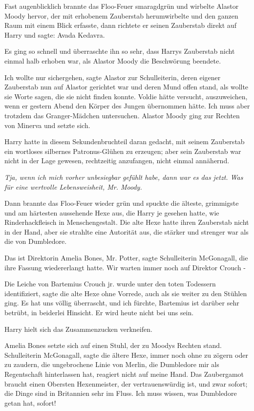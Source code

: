 Fast augenblicklich brannte das Floo-Feuer smaragdgrün und wirbelte Alastor
Moody hervor, der mit erhobenem Zauberstab herumwirbelte und den ganzen Raum mit
einem Blick erfasste, dann richtete er seinen Zauberstab direkt auf Harry und
sagte: \glqq{}Avada Kedavra.\grqq{}

Es ging so schnell und überraschte ihn so sehr, dass Harrys Zauberstab nicht
einmal halb erhoben war, als Alastor Moody die Beschwörung beendete.

\glqq{}Ich wollte nur sichergehen\grqq{}, sagte Alastor zur Schulleiterin, deren
eigener Zauberstab nun auf Alastor gerichtet war und deren Mund offen stand, als
wollte sie Worte sagen, die sie nicht finden konnte. \glqq{}Voldie hätte
versucht, auszuweichen, wenn er gestern Abend den Körper des Jungen übernommen
hätte. Ich muss aber trotzdem das Granger-Mädchen untersuchen.\grqq{} Alastor Moody
ging zur Rechten von Minerva und setzte sich.

Harry hatte in diesem Sekundenbruchteil daran gedacht, mit seinem Zauberstab ein
wortloses silbernes Patronus-Glühen zu erzeugen; aber sein Zauberstab war nicht
in der Lage gewesen, rechtzeitig anzufangen, nicht einmal annähernd.

\emph{Tja, wenn ich mich vorher unbesiegbar gefühlt habe, dann war es das jetzt.
Was für eine wertvolle Lebensweisheit, Mr. Moody.}

Dann brannte das Floo-Feuer wieder grün und spuckte die älteste, grimmigste und
am härtesten aussehende Hexe aus, die Harry je gesehen hatte, wie
Rinderhackfleisch in Menschengestalt. Die alte Hexe hatte ihren Zauberstab nicht
in der Hand, aber sie strahlte eine Autorität aus, die stärker und strenger war
als die von Dumbledore.

\glqq{}Das ist Direktorin Amelia Bones, Mr. Potter\grqq{}, sagte Schulleiterin
McGonagall, die ihre Fassung wiedererlangt hatte. \glqq{}Wir warten immer noch
auf Direktor Crouch -\grqq{}

\glqq{}Die Leiche von Bartemius Crouch jr. wurde unter den toten Todessern
identifiziert\grqq{}, sagte die alte Hexe ohne Vorrede, auch als sie weiter zu
den Stühlen ging. \glqq{}Es hat uns völlig überrascht, und ich fürchte, Bartemius
ist darüber sehr betrübt, in beiderlei Hinsicht. Er wird heute nicht bei uns
sein.\grqq{}

Harry hielt sich das Zusammenzucken verkneifen.

Amelia Bones setzte sich auf einen Stuhl, der zu Moodys Rechten stand. \glqq{}
Schulleiterin McGonagall\grqq{}, sagte die ältere Hexe, immer noch ohne zu
zögern oder zu zaudern, \glqq{}die ungebrochene Linie von Merlin, die Dumbledore
mir als Regentschaft hinterlassen hat, reagiert nicht auf meine Hand. Das
Zaubergamot braucht einen Obersten Hexenmeister, der vertrauenswürdig ist, und
zwar sofort; die Dinge sind in Britannien sehr im Fluss. Ich muss wissen, was
Dumbledore getan hat, sofort!\grqq{}

